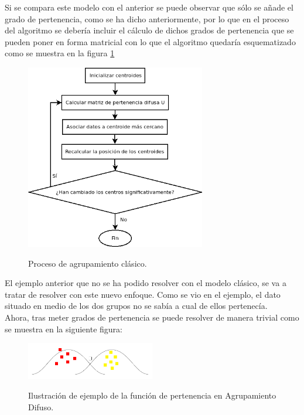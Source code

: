 \documentclass[]{report}
\begin{document}
			Si se compara este modelo con el anterior se puede observar que sólo se añade el grado de pertenencia, como se ha dicho anteriormente, por lo que en el proceso del algoritmo se debería incluir el cálculo de dichos grados de pertenencia que se pueden poner en forma matricial con lo que el algoritmo quedaría esquematizado como se muestra en la figura \ref{agrupamiento_difuso}
			
			\begin{figure}[h]
				\centering
				\includegraphics[width=0.7\textwidth]{agrupamiento-difuso.png}
				\label{agrupamiento_difuso}
				\caption{Proceso de agrupamiento clásico.}
			\end{figure}
						
			El ejemplo anterior que no se ha podido resolver con el modelo clásico, se va a tratar de resolver con este nuevo enfoque. Como se vio en el ejemplo, el dato situado en medio de los dos grupos no se sabía a cual de ellos pertenecía.\\
			
			Ahora, tras meter grados de pertenencia se puede resolver de manera trivial como se muestra en la siguiente figura:
			
			\begin{figure}[h]
				\centering
				\includegraphics[width=0.5\textwidth]{clustering_difuso.jpg}
				\label{clustering_difuso}
				\caption{Ilustración de ejemplo de la función de pertenencia en Agrupamiento Difuso.}
			\end{figure}
		
\end{document}
